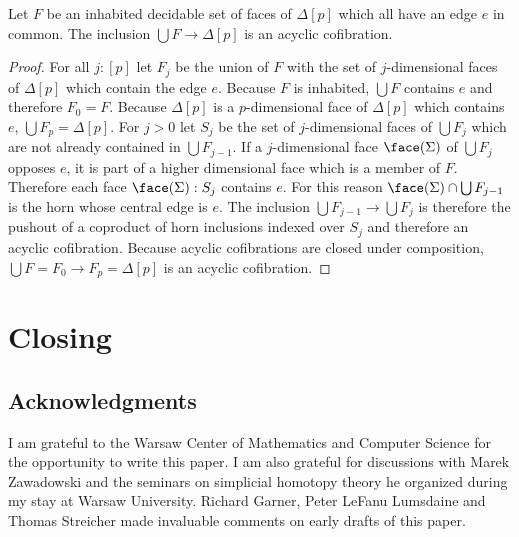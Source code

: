 \documentclass{tac}
\newcommand\of{:}
\newcommand\simplex\Delta
\begin{document}
\begin{lemma} Let $F$ be an inhabited decidable set of faces of $\simplex[p]$ which all have an edge $e$ in common. The inclusion $\bigcup F\to \simplex[p]$ is an acyclic cofibration. \label{face completion} \end{lemma}

\begin{proof} For all $j\of[p]$ let $F_j$ be the union of $F$ with the set of $j$-dimensional faces of $\simplex[p]$ which contain the edge $e$. Because $F$ is inhabited, $\bigcup F$ contains $e$ and therefore $F_0=F$. Because $\simplex[p]$ is a $p$-dimensional face of $\simplex[p]$ which contains $e$, $\bigcup F_p = \simplex[p]$. For $j>0$ let $S_j$ be the set of $j$-dimensional faces of $\bigcup F_j$ which are not already contained in $\bigcup F_{j-1}$. If a $j$-dimensional face $\face(\Sigma)$ of $\bigcup F_j$ opposes $e$, it is part of a higher dimensional face which is a member of $F$. Therefore each face $\face(\Sigma)\of S_j$ contains $e$. For this reason $\face(\Sigma)\cap \bigcup F_{j-1}$ is the horn whose central edge is $e$. The inclusion $\bigcup F_{j-1}\to\bigcup F_j$ is therefore the pushout of a coproduct of horn inclusions indexed over $S_j$ and therefore an acyclic cofibration. Because acyclic cofibrations are closed under composition, $\bigcup F = F_0\to F_p = \simplex[p]$ is an acyclic cofibration. 
\end{proof}


\section{Closing}

\subsection*{Acknowledgments} 
I am grateful to the Warsaw Center of Mathematics and Computer Science for the opportunity to write this paper. I am also grateful for discussions with Marek Zawadowski and the seminars on simplicial homotopy theory he organized during my stay at Warsaw University. Richard Garner, Peter LeFanu Lumsdaine and Thomas Streicher made invaluable comments on early drafts of this paper.



\printbibliography
\end{document}

